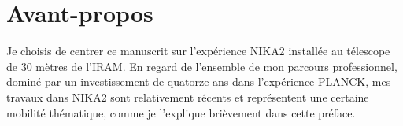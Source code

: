 \documentclass[a4paper, 12pt]{report}
\begin{document}




%
\newpage
\tableofcontents
\newpage


% 
%

\chapter*{Avant-propos}

Je choisis de centrer ce manuscrit sur l'expérience NIKA2 installée au
télescope de 30 mètres de l'IRAM. En regard de l'ensemble de mon parcours
professionnel, dominé par un investissement de quatorze ans dans
l'expérience PLANCK, mes travaux dans NIKA2 sont relativement récents
et représentent une certaine mobilité thématique, comme je l'explique
brièvement dans cette préface. 
\end{document}
